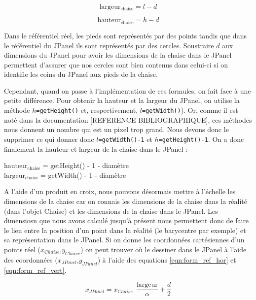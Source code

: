 \documentclass{polytech/polytech}
\begin{document}
\begin{equation}
\mathrm{largeur_{chaise}} = l - d
\end{equation}

\begin{equation}
\mathrm{hauteur_{chaise}} = h - d
\end{equation}

Dans le référentiel réel, les pieds sont représentés par des points tandis que dans le référentiel du JPanel ils sont représentés par des cercles. 
Soustraire $d$ aux dimensions du JPanel pour avoir les dimensions de la chaise dans le JPanel permettent d'assurer que nos cercles sont bien contenus dans celui-ci si on identifie les coins du JPanel aux pieds de la chaise.

Cependant, quand on passe à l'implémentation de ces formules, on fait face à une petite différence. 
Pour obtenir la hauteur et la largeur du JPanel, on utilise la méthode \texttt{$h$=getHeight()} et, respectivement, \texttt{$l$=getWidth()}).
Or, comme il est noté dans la documentation [REFERENCE BIBLIOGRAPHIQUE], ces méthodes nous donnent un nombre qui est un pixel trop grand. 
Nous devons donc le supprimer ce qui donner donc \texttt{$l$=getWidth()-1} et \texttt{$h$=getHeight()-1}.
On a donc finalement la hauteur et largeur de la chaise dans le JPanel :

\begin{center}
$\mathrm{hauteur_{chaise}}$  = getHeight() - 1 - diamètre\\
$\mathrm{largeur_{chaise}}$ = getWidth() - 1 - diamètre
\end{center}

A l'aide d'un produit en croix, nous pouvons désormais mettre à l'échelle les dimensions de la chaise car on connais les dimensions de la chaise dans la réalité (dans l'objet Chaise) et les dimensions de la chaise dans le JPanel.
Les dimensiosn que nous avons calculé jusqu'à présent nous permettent donc de faire le lien entre la position d'un point dans la réalité (le barycentre par exemple) et sa représentation dans le JPanel.
Si on donne les coordonnées cartésiennes d'un points réel ($x_{Chaise}$,$y_{Chaise}$) on peut trouver où le dessiner dans le JPanel à l'aide des coordonnées ($x_{JPanel}$,$y_{JPanel}$) à l'aide des equations \eqref{eqn:form_ref_hor} et \eqref{eqn:form_ref_vert}.

\begin{equation}
\label{eqn:form_ref_hor}
x_{JPanel} = x_{Chaise}\ \ \frac{\mathrm{largeur}}{\alpha} + \frac{d}{2}
\end{equation}
\end{document}
